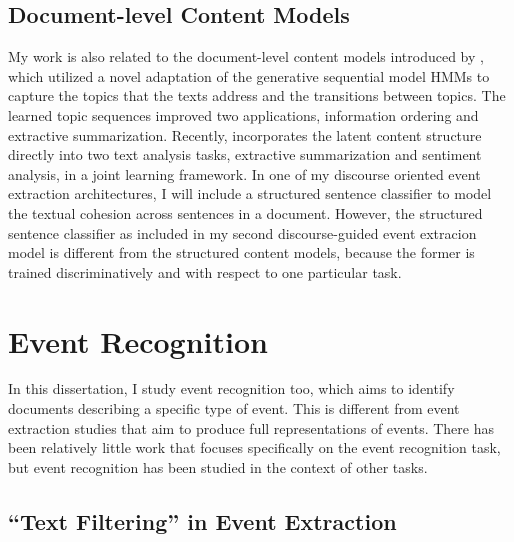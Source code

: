 \subsection{Document-level Content Models}

My work is also related to the document-level content models introduced by
\cite{Barzilay04}, which utilized a novel adaptation of 
the 
generative
sequential model HMMs \cite{Rabiner89} to capture the topics that the
texts address and the transitions between topics. The learned topic
sequences improved two applications, information ordering and
extractive summarization. Recently, \cite{Sauper10} incorporates the
latent content structure directly into two text analysis tasks,
extractive summarization and sentiment analysis, in a joint learning
framework. In one of my discourse oriented event extraction architectures, I will include a
structured sentence classifier to model the textual cohesion across sentences in a document.
However, the structured sentence classifier as included in my 
second discourse-guided event extracion model is different from the structured content models, 
because the former is trained discriminatively and  with respect to one particular task. 


\section{Event Recognition}
In this dissertation, I study event recognition too, which  
aims to identify documents describing a specific
type of event. 
This is different from event extraction studies 
that aim to produce full representations of events. 
There has been relatively little work that focuses specifically on the
event recognition task, but event recognition has been studied in the
context of other tasks. 

\subsection{``Text Filtering'' in Event Extraction}

